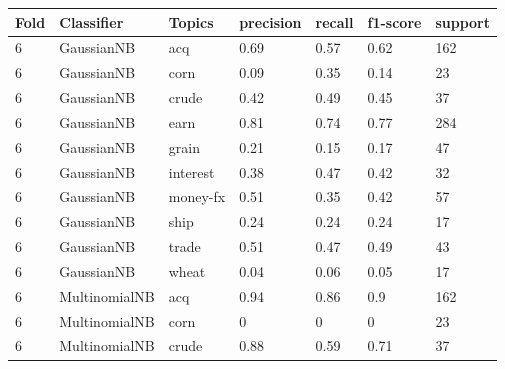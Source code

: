 \documentclass{article}
\begin{document}
\begin{table}[h]
\begin{tabular}{lllllll}
\textbf{Fold} & \textbf{Classifier}    & \textbf{Topics} & \textbf{precision} & \textbf{recall} & \textbf{f1-score} & \textbf{support} \\ \hline
6             & GaussianNB             & acq             & 0.69               & 0.57            & 0.62              & 162              \\
6             & GaussianNB             & corn            & 0.09               & 0.35            & 0.14              & 23               \\
6             & GaussianNB             & crude           & 0.42               & 0.49            & 0.45              & 37               \\
6             & GaussianNB             & earn            & 0.81               & 0.74            & 0.77              & 284              \\
6             & GaussianNB             & grain           & 0.21               & 0.15            & 0.17              & 47               \\
6             & GaussianNB             & interest        & 0.38               & 0.47            & 0.42              & 32               \\
6             & GaussianNB             & money-fx        & 0.51               & 0.35            & 0.42              & 57               \\
6             & GaussianNB             & ship            & 0.24               & 0.24            & 0.24              & 17               \\
6             & GaussianNB             & trade           & 0.51               & 0.47            & 0.49              & 43               \\
6             & GaussianNB             & wheat           & 0.04               & 0.06            & 0.05              & 17               \\
6             & MultinomialNB          & acq             & 0.94               & 0.86            & 0.9               & 162              \\
6             & MultinomialNB          & corn            & 0                  & 0               & 0                 & 23               \\
6             & MultinomialNB          & crude           & 0.88               & 0.59            & 0.71              & 37               \\

\end{tabular}
\end{table}
\end{document}
